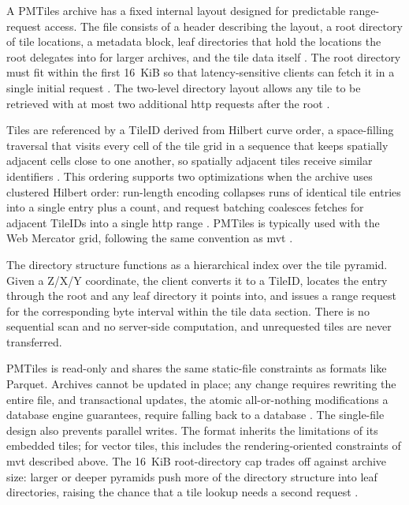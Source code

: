 A PMTiles archive has a fixed internal layout designed for predictable range-request access. The file consists of a header describing the layout, a root directory of tile locations, a metadata block, leaf directories that hold the locations the root delegates into for larger archives, and the tile data itself \parencite{protomaps2024_pmtiles_specification_v3}. The root directory must fit within the first 16~KiB so that latency-sensitive clients can fetch it in a single initial request \parencite{protomaps2024_pmtiles_specification_v3}. The two-level directory layout allows any tile to be retrieved with at most two additional \acrshort{http} requests after the root \parencite{protomaps2023_pmtiles_v3_whats_new}.

Tiles are referenced by a TileID derived from Hilbert curve order, a space-filling traversal that visits every cell of the tile grid in a sequence that keeps spatially adjacent cells close to one another, so spatially adjacent tiles receive similar identifiers \parencite{protomaps2024_pmtiles_specification_v3, cngfoundation2024_pmtiles_guide}. This ordering supports two optimizations when the archive uses clustered Hilbert order: run-length encoding collapses runs of identical tile entries into a single entry plus a count, and request batching coalesces fetches for adjacent TileIDs into a single \acrshort{http} range \parencite{protomaps2024_pmtiles_specification_v3, protomaps2023_pmtiles_v3_whats_new}. PMTiles is typically used with the Web Mercator grid, following the same convention as \acrshort{mvt} \parencite{cngfoundation2024_pmtiles_guide}.

The directory structure functions as a hierarchical index over the tile pyramid. Given a Z/X/Y coordinate, the client converts it to a TileID, locates the entry through the root and any leaf directory it points into, and issues a range request for the corresponding byte interval within the tile data section. There is no sequential scan and no server-side computation, and unrequested tiles are never transferred.

PMTiles is read-only and shares the same static-file constraints as formats like Parquet. Archives cannot be updated in place; any change requires rewriting the entire file, and transactional updates, the atomic all-or-nothing modifications a database engine guarantees, require falling back to a database \parencite{protomaps2024_pmtiles_concepts}. The single-file design also prevents parallel writes. The format inherits the limitations of its embedded tiles; for vector tiles, this includes the rendering-oriented constraints of \acrshort{mvt} described above. The 16~KiB root-directory cap trades off against archive size: larger or deeper pyramids push more of the directory structure into leaf directories, raising the chance that a tile lookup needs a second request \parencite{protomaps2024_pmtiles_specification_v3, protomaps2023_pmtiles_v3_whats_new}.

